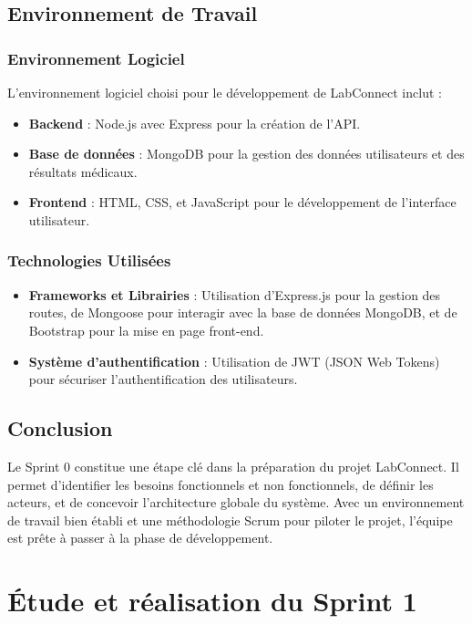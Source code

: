 \documentclass[12pt,a4paper]{report}
\begin{document}
\section{Environnement de Travail}

\subsection{Environnement Logiciel}
L'environnement logiciel choisi pour le développement de LabConnect inclut :

\begin{itemize}
    \item \textbf{Backend} : Node.js avec Express pour la création de l'API.
    \item \textbf{Base de données} : MongoDB pour la gestion des données utilisateurs et des résultats médicaux.
    \item \textbf{Frontend} : HTML, CSS, et JavaScript pour le développement de l'interface utilisateur.
\end{itemize}

\subsection{Technologies Utilisées}
\begin{itemize}
    \item \textbf{Frameworks et Librairies} : Utilisation d'Express.js pour la gestion des routes, de Mongoose pour interagir avec la base de données MongoDB, et de Bootstrap pour la mise en page front-end.
    \item \textbf{Système d'authentification} : Utilisation de JWT (JSON Web Tokens) pour sécuriser l'authentification des utilisateurs.
\end{itemize}

\section{Conclusion}
Le Sprint 0 constitue une étape clé dans la préparation du projet LabConnect. Il permet d'identifier les besoins fonctionnels et non fonctionnels, de définir les acteurs, et de concevoir l'architecture globale du système. Avec un environnement de travail bien établi et une méthodologie Scrum pour piloter le projet, l'équipe est prête à passer à la phase de développement.
\chapter{Étude et réalisation du Sprint 1}
\end{document}
